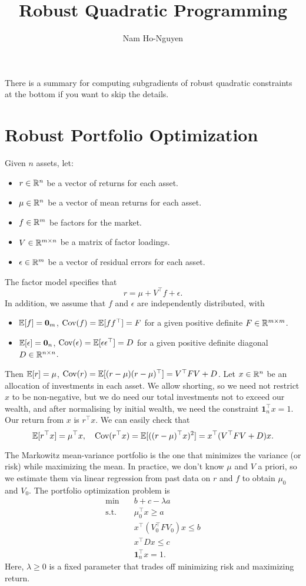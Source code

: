 \documentclass[11pt,oneside]{article}
\title{Robust Quadratic Programming}
\author[1]{Nam Ho-Nguyen}
\date{}%
\theoremstyle{plain}
\theoremstyle{definition}
\theoremstyle{remark}
\begin{document}
\maketitle

There is a summary for computing subgradients of robust quadratic constraints at the bottom if you want to skip the details.

\section{Robust Portfolio Optimization}

Given $n$ assets, let:
\begin{itemize}
\item $r \in \mathbb{R}^n$ be a vector of returns for each asset.
\item $\mu \in \mathbb{R}^n$ be a vector of mean returns for each asset.
\item $f \in \mathbb{R}^m$ be factors for the market.
\item $V \in \mathbb{R}^{m \times n}$ be a matrix of factor loadings.
\item $\epsilon \in \mathbb{R}^m$ be a vector of residual errors for each asset.
\end{itemize}
The factor model specifies that
\[ r = \mu + V^\top f + \epsilon. \]
In addition, we assume that $f$ and $\epsilon$ are independently distributed, with
\begin{itemize}
\item $\mathbb{E}[f]=\bm{0}_m$, ${\hbox{\rm Cov}}(f) = \mathbb{E}[ff^\top] = F$ for a given positive definite $F \in \mathbb{R}^{m \times m}$.
\item $\mathbb{E}[\epsilon]=\bm{0}_n$, ${\hbox{\rm Cov}}(\epsilon) = \mathbb{E}[\epsilon \epsilon^\top] = D$ for a given positive definite diagonal $D \in \mathbb{R}^{n \times n}$.
\end{itemize}
Then $\mathbb{E}[r] = \mu$, ${\hbox{\rm Cov}}(r) = \mathbb{E}[(r-\mu)(r-\mu)^\top] = V^\top F V + D$. Let $x \in \mathbb{R}^n$ be an allocation of investments in each asset. We allow shorting, so we need not restrict $x$ to be non-negative, but we do need our total investments not to exceed our wealth, and after normalising by initial wealth, we need the constraint $\bm{1}_n^\top x = 1$. Our return from $x$ is $r^\top x$. We can easily check that
\[ \mathbb{E}[r^\top x] = \mu^\top x, \quad {\hbox{\rm Cov}}(r^\top x) = \mathbb{E}[((r-\mu)^\top x)^2] = x^\top (V^\top F V + D) x. \]

The Markowitz mean-variance portfolio is the one that minimizes the variance (or risk) while maximizing the mean. In practice, we don't know $\mu$ and $V$ a priori, so we estimate them via linear regression from past data on $r$ and $f$ to obtain $\mu_0$ and $V_0$. The portfolio optimization problem is
\begin{align*}
\min &\quad b + c - \lambda a\\
\text{s.t.} &\quad \mu_0^\top x \geq a\\
&\quad x^\top (V_0^\top F V_0) x \leq b\\
&\quad x^\top D x \leq c\\
&\quad \bm{1}_n^\top x = 1.
\end{align*}
Here, $\lambda \geq 0$ is a fixed parameter that trades off minimizing risk and maximizing return.
\end{document}
